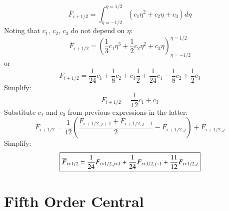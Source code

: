 \documentclass{warpdoc}
\newcommand\frameeqn[1]{\fbox{$\displaystyle #1$}}
\begin{document}
%
%
\begin{equation}
\overline{F}_{i+1/2}=\int_{\eta=-1/2}^{\eta=1/2} (c_1 \eta^2 + c_2 \eta + c_3 ) d\eta
\end{equation}
%
Noting that $c_1$, $c_2$, $c_3$ do not depend on $\eta$:
%
\begin{equation}
\overline{F}_{i+1/2}=\left(\frac{1}{3}c_1 \eta^3 + \frac{1}{2} c_2 \eta^2 + c_3 \eta\right)_{\eta=-1/2}^{\eta=1/2} 
\end{equation}
%
or
%
\begin{equation}
\overline{F}_{i+1/2}=\frac{1}{24}c_1  + \frac{1}{8} c_2  + c_3 \frac{1}{2}
+\frac{1}{24}c_1  - \frac{1}{8} c_2  + \frac{1}{2} c_3 
\end{equation}
%
Simplify:
%
\begin{equation}
\overline{F}_{i+1/2}=\frac{1}{12}c_1   + c_3 
\end{equation}
%
Substitute $c_1$ and $c_3$ from previous expressions in the latter:
%
\begin{equation}
\overline{F}_{i+1/2}=\frac{1}{12}\left(\frac{F_{i+1/2,j+1}+F_{i+1/2,j-1}}{2}- F_{i+1/2,j} \right)   + F_{i+1/2,j} 
\end{equation}
%
Simplify:
%
\begin{equation}
\frameeqn{
\overline{F}_{i+1/2}=\frac{1}{24} F_{i+1/2,j+1}+ \frac{1}{24}F_{i+1/2,j-1}   + \frac{11}{12}F_{i+1/2,j} 
}
\end{equation}
%



\section{Fifth Order Central}
\end{document}

